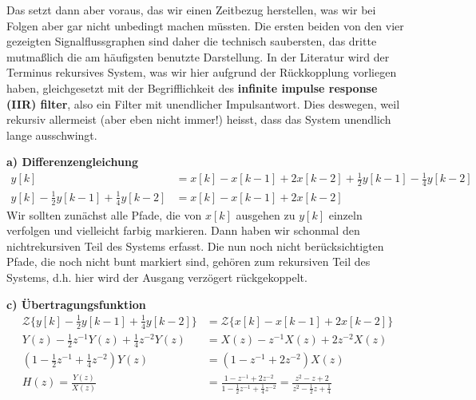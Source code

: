 \begin{Loesung}
\begin{center}
\end{center}
Das setzt dann aber voraus, das wir einen Zeitbezug herstellen, was wir
bei Folgen aber gar nicht unbedingt machen müssten. Die ersten beiden von den
vier gezeigten Signalflussgraphen sind daher die technisch saubersten,
das dritte mutmaßlich die am häufigsten benutzte Darstellung.
%
In der Literatur wird der Terminus rekursives System, was wir hier aufgrund
der Rückkopplung vorliegen haben, gleichgesetzt mit der Begrifflichkeit
des \textbf{infinite impulse response (IIR) filter}, also ein Filter
mit unendlicher Impulsantwort. Dies deswegen, weil rekursiv allermeist
(aber eben nicht immer!) heisst, dass das System unendlich lange ausschwingt.


\noindent\textbf{a) Differenzengleichung}
\begin{align}
y[k] &= x[k] - x[k-1] + 2x[k-2] + \frac{1}{2}y[k-1] - \frac{1}{4}y[k-2] \\
y[k] - \frac{1}{2}y[k-1] + \frac{1}{4}y[k-2] &= x[k] - x[k-1] + 2x[k-2]
\end{align}
Wir sollten zunächst alle Pfade, die von $x[k]$ ausgehen zu $y[k]$ einzeln
verfolgen und vielleicht farbig markieren. Dann haben wir schonmal den
nichtrekursiven Teil des Systems erfasst. Die nun noch nicht berücksichtigten
Pfade, die noch nicht bunt markiert sind, gehören zum rekursiven Teil
des Systems, d.h. hier wird der Ausgang verzögert rückgekoppelt.

\noindent\textbf{c) Übertragungsfunktion}
\begin{align}
\mathcal{Z}\{y[k] - \frac{1}{2}y[k-1] + \frac{1}{4}y[k-2]\} &= \mathcal{Z}\{x[k] - x[k-1] + 2x[k-2]\} \\
Y(z) - \frac{1}{2}z^{-1}Y(z) + \frac{1}{4}z^{-2}Y(z) &= X(z) - z^{-1}X(z) + 2z^{-2}X(z) \\
\left(1 - \frac{1}{2}z^{-1} + \frac{1}{4}z^{-2}\right)Y(z) &= \left(1 - z^{-1} + 2z^{-2}\right)X(z) \\
H(z) = \frac{Y(z)}{X(z)} &= \frac{1 - z^{-1} + 2z^{-2}}{1 - \frac{1}{2}z^{-1} + \frac{1}{4}z^{-2}}
= \frac{z^2 - z + 2}{z^2 - \frac{1}{2}z + \frac{1}{4}}
\end{align}


\end{Loesung}
